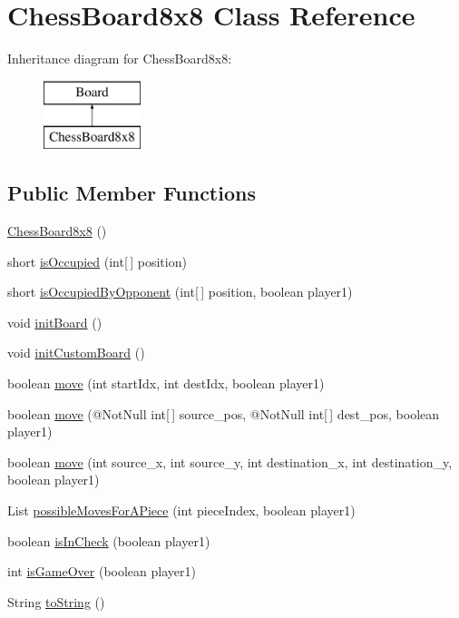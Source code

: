 \hypertarget{class_chess_board8x8}{}\section{Chess\+Board8x8 Class Reference}
\label{class_chess_board8x8}
Inheritance diagram for Chess\+Board8x8\+:\begin{figure}[H]
\begin{center}
\leavevmode
\includegraphics[height=2.000000cm]{class_chess_board8x8}
\end{center}
\end{figure}
\subsection*{Public Member Functions}
\begin{DoxyCompactItemize}
\item 
\mbox{\hyperlink{class_chess_board8x8_a808a23624fe757f342e7c49ebb73f9e6}{Chess\+Board8x8}} ()
\item 
short \mbox{\hyperlink{class_chess_board8x8_a699c6504705da71bab0662d5d92af5ce}{is\+Occupied}} (int\mbox{[}$\,$\mbox{]} position)
\item 
short \mbox{\hyperlink{class_chess_board8x8_ad1846ea32668dc608ff39112141a4182}{is\+Occupied\+By\+Opponent}} (int\mbox{[}$\,$\mbox{]} position, boolean player1)
\item 
void \mbox{\hyperlink{class_chess_board8x8_aaa6bdac1813e13604323507365a34e27}{init\+Board}} ()
\item 
void \mbox{\hyperlink{class_chess_board8x8_a1014b40768bc649f2056061b51af8dcf}{init\+Custom\+Board}} ()
\item 
boolean \mbox{\hyperlink{class_chess_board8x8_ae2857331221517049fbfa8937e9fd97a}{move}} (int start\+Idx, int dest\+Idx, boolean player1)
\item 
boolean \mbox{\hyperlink{class_chess_board8x8_a99f5913eeb71719575e3356395f7949a}{move}} (@Not\+Null int\mbox{[}$\,$\mbox{]} source\+\_\+pos, @Not\+Null int\mbox{[}$\,$\mbox{]} dest\+\_\+pos, boolean player1)
\item 
boolean \mbox{\hyperlink{class_chess_board8x8_ac81ec5db9d9d006832d5b427b7e37830}{move}} (int source\+\_\+x, int source\+\_\+y, int destination\+\_\+x, int destination\+\_\+y, boolean player1)
\item 
List \mbox{\hyperlink{class_chess_board8x8_a02f5f861cb4bac9a16b9253ec5366300}{possible\+Moves\+For\+A\+Piece}} (int piece\+Index, boolean player1)
\item 
boolean \mbox{\hyperlink{class_chess_board8x8_a195cc32e8b1f59447d0e1125da727f31}{is\+In\+Check}} (boolean player1)
\item 
int \mbox{\hyperlink{class_chess_board8x8_a5ea849ab3a349ce06edba6b6b7142118}{is\+Game\+Over}} (boolean player1)
\item 
String \mbox{\hyperlink{class_chess_board8x8_a2ce9fc93ae4a22ffb4b4c7cd485b32fb}{to\+String}} ()
\end{DoxyCompactItemize}
